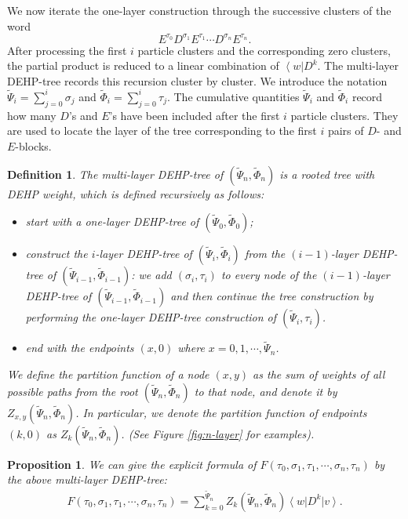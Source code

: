 \documentclass[12pt,a4paper]{amsart}
\newcommand{\bra}[1]{\left\langle #1\right|}
\newcommand{\ket}[1]{\left|#1\right\rangle}
\newtheorem{definition}[theorem]{Definition}
\newtheorem{proposition}[theorem]{Proposition}
\theoremstyle{remark}
\numberwithin{equation}{section} \numberwithin{theorem}{section}
\begin{document}
We now iterate the one-layer construction through the successive clusters of the word
\[
E^{\tau_0}D^{\sigma_1}E^{\tau_1}\cdots D^{\sigma_n}E^{\tau_n}.
\]
After processing the first $i$ particle clusters and the corresponding zero clusters, the partial product is reduced to a linear combination of $\bra{w}D^k$. 
The multi-layer DEHP-tree records this recursion cluster by cluster.
We introduce the notation $\tilde{\Psi}_i=\sum_{j=0}^{i}\sigma_j$ and $\tilde{\Phi}_i=\sum_{j=0}^{i}\tau_j$. 
The cumulative quantities $\tilde\Psi_i$ and $\tilde\Phi_i$ record how many $D$'s and $E$'s have been included after the first $i$ particle clusters. 
They are used to locate the layer of the tree corresponding to the first $i$ pairs of $D$- and $E$-blocks.


\begin{definition}
\label{def:n-layer tree}
The {\em  multi-layer DEHP-tree} of $(\tilde{\Psi}_n, \tilde{\Phi}_n)$ is a rooted tree with {\em  DEHP weight}, which is defined recursively as follows:
\begin{itemize}
\item start with a {\em one-layer DEHP-tree} of $(\tilde{\Psi}_0, \tilde{\Phi}_0)$;
\item construct the {\em $i$-layer DEHP-tree} of $(\tilde{\Psi}_i, \tilde{\Phi}_i)$ from the {\em $(i-1)$-layer DEHP-tree} of $(\tilde{\Psi}_{i-1}, \tilde{\Phi}_{i-1})$: we add $(\sigma_i, \tau_i)$ to every node of the {\em $(i-1)$-layer DEHP-tree} of $(\tilde{\Psi}_{i-1}, \tilde{\Phi}_{i-1})$ and then continue the tree construction by performing the {\em one-layer DEHP-tree} construction of $(\tilde{\Psi}_i, \tau_i)$.
\item end with the {\em endpoints} $(x,0)$ where $x=0,1,\cdots,\tilde{\Psi}_n$.
\end{itemize}
We define the {\em partition function} of a node $(x,y)$ as the sum of weights of all possible paths from the root $(\tilde{\Psi}_n, \tilde{\Phi}_n)$ to that node, and denote it by $Z_{x,y}(\tilde{\Psi}_n, \tilde{\Phi}_n)$. In particular, we denote the partition function of endpoints $(k,0)$ as $Z_k(\tilde{\Psi}_n, \tilde{\Phi}_n)$.  (See Figure \ref{fig:n-layer} for examples). 
\end{definition}

\begin{proposition}
We can give the explicit formula of $F(\tau_0, \sigma_1, \tau_1, \cdots, \sigma_n, \tau_n)$ by the above {\em  multi-layer DEHP-tree}:
\begin{align}
\label{eq:n-layer}
F(\tau_0, \sigma_1, \tau_1, \cdots, \sigma_n, \tau_n)=\sum_{k=0}^{\tilde{\Psi}_n}Z_k(\tilde{\Psi}_n, \tilde{\Phi}_n)\bra{w}D^{k}\ket{v}.
\end{align}
\end{proposition}
\end{document}

